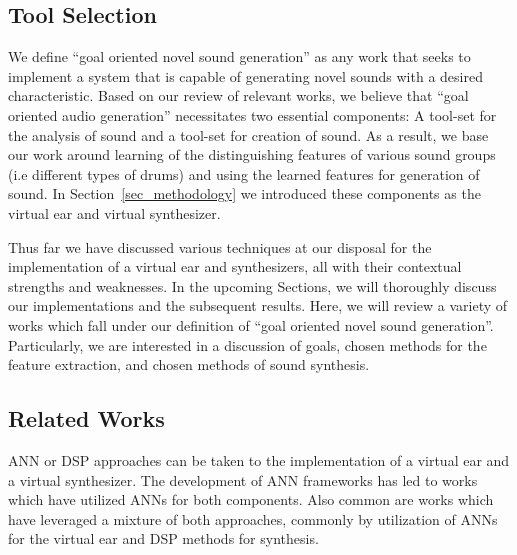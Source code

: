 \documentclass[\main/thesis.tex]{subfiles}
\begin{document}
\label{related}
\subsection{Tool Selection}
We define \enquote{goal oriented novel sound generation} as any work that seeks to implement a system that is capable of generating novel sounds with a desired characteristic. Based on our review of relevant works, we believe that \enquote{goal oriented audio generation} necessitates two essential components: A tool-set for the analysis of sound and a tool-set for creation of sound. As a result, we base our work around learning of the distinguishing features of various sound groups (i.e different types of drums) and using the learned features for generation of sound. In Section~\ref{sec_methodology} we introduced these components as the virtual ear and virtual synthesizer. 

 Thus far we have discussed various techniques at our disposal for the implementation of a virtual ear and synthesizers, all with their contextual strengths and weaknesses. In the upcoming Sections, we will thoroughly discuss our implementations and the subsequent results. Here, we will review a variety of works which fall under our definition of \enquote{goal oriented novel sound generation}. Particularly, we are interested in a discussion of goals, chosen methods for the feature extraction, and chosen methods of sound synthesis. 

\subsection{Related Works}
ANN or DSP approaches can be taken to the implementation of a virtual ear and a virtual synthesizer. The development of ANN frameworks has led to works which have utilized ANNs for both components. Also common are works which have leveraged a mixture of both approaches, commonly by utilization of ANNs for the virtual ear and DSP methods for synthesis.
\end{document}
